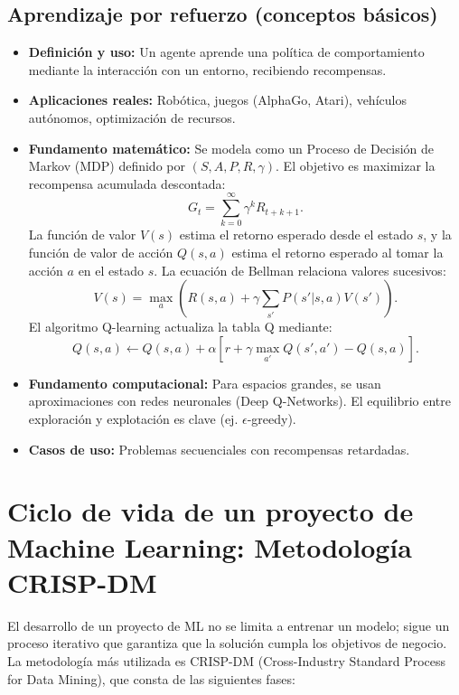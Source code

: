 \documentclass[12pt,a4paper,openany,oneside]{book}
\begin{document}
\subsection{Aprendizaje por refuerzo (conceptos básicos)}
\begin{itemize}
    \item \textbf{Definición y uso:} Un agente aprende una política de comportamiento mediante la interacción con un entorno, recibiendo recompensas.
    \item \textbf{Aplicaciones reales:} Robótica, juegos (AlphaGo, Atari), vehículos autónomos, optimización de recursos.
    \item \textbf{Fundamento matemático:} Se modela como un Proceso de Decisión de Markov (MDP) definido por \((S, A, P, R, \gamma)\). El objetivo es maximizar la recompensa acumulada descontada:
    \[
    G_t = \sum_{k=0}^\infty \gamma^k R_{t+k+1}.
    \]
    La función de valor \(V(s)\) estima el retorno esperado desde el estado \(s\), y la función de valor de acción \(Q(s,a)\) estima el retorno esperado al tomar la acción \(a\) en el estado \(s\). La ecuación de Bellman relaciona valores sucesivos:
    \[
    V(s) = \max_a \left( R(s,a) + \gamma \sum_{s'} P(s'|s,a) V(s') \right).
    \]
    El algoritmo Q-learning actualiza la tabla Q mediante:
    \[
    Q(s,a) \leftarrow Q(s,a) + \alpha \left[ r + \gamma \max_{a'} Q(s',a') - Q(s,a) \right].
    \]
    \item \textbf{Fundamento computacional:} Para espacios grandes, se usan aproximaciones con redes neuronales (Deep Q-Networks). El equilibrio entre exploración y explotación es clave (ej. \(\epsilon\)-greedy).
    \item \textbf{Casos de uso:} Problemas secuenciales con recompensas retardadas.
\end{itemize}

\section{Ciclo de vida de un proyecto de Machine Learning: Metodología CRISP-DM}
El desarrollo de un proyecto de ML no se limita a entrenar un modelo; sigue un proceso iterativo que garantiza que la solución cumpla los objetivos de negocio. La metodología más utilizada es CRISP-DM (Cross-Industry Standard Process for Data Mining), que consta de las siguientes fases:
\end{document}
